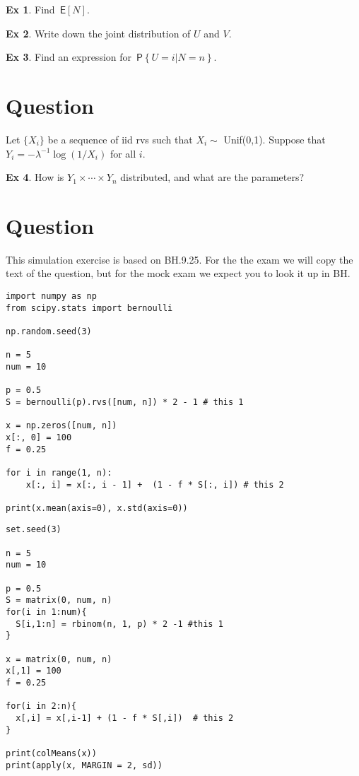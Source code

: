 \documentclass[12pt]{article}
\theoremstyle{definition}
\newtheorem{exercise}{Ex}[section]
\renewcommand{\P}[1]{\,\mathsf{P}\left\{#1\right\}}
\newcommand{\E}[1]{\,\mathsf{E}\left[#1\right]}
\newcommand{\1}[1]{\,I_{#1}} %
\begin{document}
\begin{exercise}
Find \(\E N\).
\end{exercise}

\begin{exercise}
Write down the joint distribution  of \(U\) and \(V\).
\end{exercise}

\begin{exercise}
Find an expression for \(\P{U=i|N=n}\).
\end{exercise}


\section{Question}
Let \(\{X_i\}\)  be a sequence of iid rvs such that \(X_i\sim\) Unif(0,1). Suppose that \(Y_i = -\lambda^{-1}\log(1/X_i)\) for all \(i\).

\begin{exercise}
How is \(Y_{1}\times \cdots \times Y_{n}\) distributed, and what are the parameters?
\end{exercise}


\section{Question}

This simulation exercise is based on BH.9.25. For the the exam we will copy the text of the question, but for the mock exam we expect you to look it up in BH.


\begin{verbatim}
import numpy as np
from scipy.stats import bernoulli

np.random.seed(3)

n = 5
num = 10

p = 0.5
S = bernoulli(p).rvs([num, n]) * 2 - 1 # this 1

x = np.zeros([num, n])
x[:, 0] = 100
f = 0.25

for i in range(1, n):
    x[:, i] = x[:, i - 1] +  (1 - f * S[:, i]) # this 2

print(x.mean(axis=0), x.std(axis=0))
\end{verbatim}

\begin{verbatim}
set.seed(3)

n = 5
num = 10

p = 0.5
S = matrix(0, num, n)
for(i in 1:num){
  S[i,1:n] = rbinom(n, 1, p) * 2 -1 #this 1
}

x = matrix(0, num, n)
x[,1] = 100
f = 0.25

for(i in 2:n){
  x[,i] = x[,i-1] + (1 - f * S[,i])  # this 2
}

print(colMeans(x))
print(apply(x, MARGIN = 2, sd))
\end{verbatim}
\end{document}

